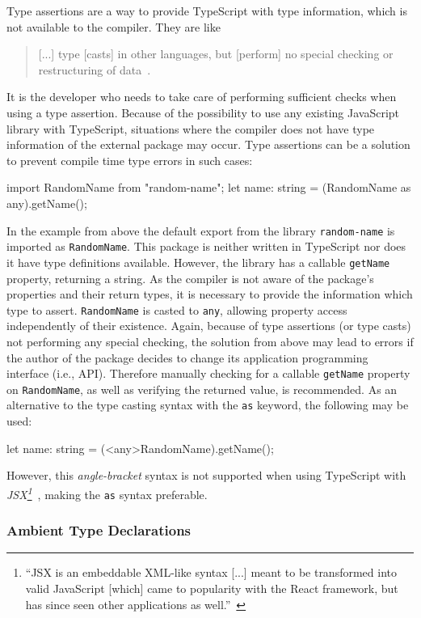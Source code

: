 Type assertions are a way to provide TypeScript with type information, which is not available to the compiler. They are like
\begin{quote}
  [...] type [casts] in other languages, but [perform] no special checking or restructuring of data~\cite{TypeScriptHandbook:BasicTypes}.
\end{quote}
It is the developer who needs to take care of performing sufficient checks when using a type assertion. Because of the possibility to use any existing JavaScript library with TypeScript, situations where the compiler does not have type information of the external package may occur. Type assertions can be a solution to prevent compile time type errors in such cases:
\begin{JsCode}[numbers=none]
import RandomName from "random-name";
let name: string = (RandomName as any).getName();
\end{JsCode}
In the example from above the default export from the library \texttt{random-name} is imported as \texttt{RandomName}. This package is neither written in TypeScript nor does it have type definitions available. However, the library has a callable \texttt{getName} property, returning a string. As the compiler is not aware of the package's properties and their return types, it is necessary to provide the information which type to assert. \texttt{RandomName} is casted to \texttt{any}, allowing property access independently of their existence. Again, because of type assertions (or type casts) not performing any special checking, the solution from above may lead to errors if the author of the package decides to change its application programming interface (i.e., API). Therefore manually checking for a callable \texttt{getName} property on \texttt{RandomName}, as well as verifying the returned value, is recommended.
As an alternative to the type casting syntax with the \texttt{as} keyword, the following may be used:
\begin{JsCode}[numbers=none]
let name: string = (<any>RandomName).getName();
\end{JsCode}
However, this \emph{angle-bracket} syntax is not supported when using TypeScript with \emph{JSX\footnote{``JSX is an embeddable XML-like syntax [...] meant to be transformed into valid JavaScript [which] came to popularity with the React framework, but has since seen other applications as well.''~\cite{TypeScriptHandbook:JSX}}}~\cite{TypeScriptHandbook:BasicTypes}, making the \texttt{as} syntax preferable.

\subsubsection{Ambient Type Declarations}
\label{sec:ts-ambient-type-declarations}

